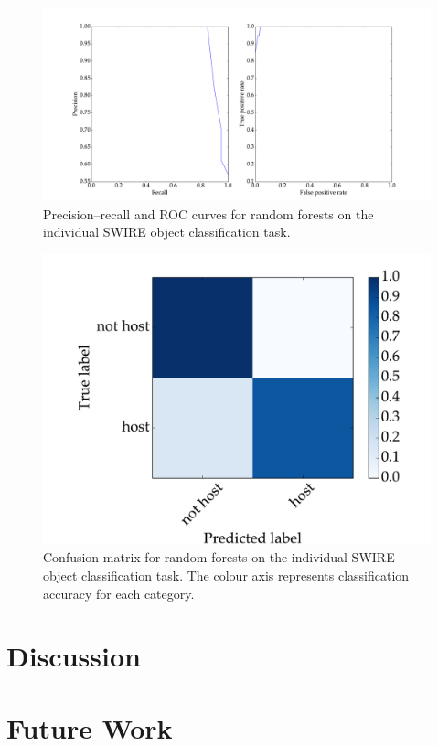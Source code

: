 \documentclass[a4paper]{article}
\begin{document}
      \begin{figure}
        \centering
        \includegraphics[width=\linewidth]{images/metrics_rf.pdf}
        \caption{Precision--recall and ROC curves for random forests on the individual SWIRE object classification task.}
        \label{fig:precision-recall-roc-rf}
      \end{figure}

      \begin{figure}
        \centering
        \includegraphics[width=0.5\linewidth]{images/confusion_rf.pdf}
        \caption{Confusion matrix for random forests on the individual SWIRE object classification task. The colour axis represents classification accuracy for each category.}
        \label{fig:confusion-rf}
      \end{figure}


  \section{Discussion}

  \section{Future Work}
\end{document}
